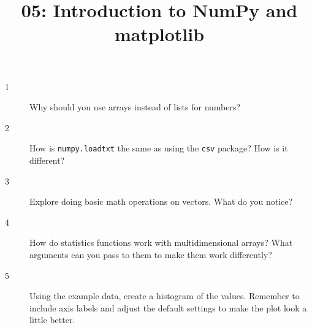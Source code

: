 \documentclass[10pt]{amsart}
\title{05: Introduction to NumPy and matplotlib}
\begin{document}
\maketitle

\begin{description}
\item[1] Why should you use arrays instead of lists for numbers?
\vspace{0.75in}

\item[2] How is \verb+numpy.loadtxt+ the same as using the \verb+csv+ package?
How is it different?
\vspace{0.75in}

\item[3] Explore doing basic math operations on vectors. What do you notice?
\vspace{0.75in}

\item[4] How do statistics functions work with multidimensional arrays? What
arguments can you pass to them to make them work differently?
\vspace{0.75in}

\item[5] Using the example data, create a histogram of the values. Remember to
include axis labels and adjust the default settings to make the plot look a
little better.
\vspace{0.75in}
\end{description}
\end{document}
